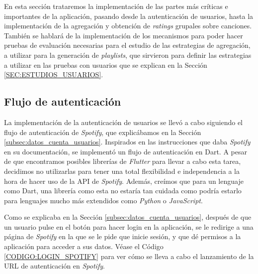 En esta sección trataremos la implementación de las partes más críticas e importantes de la aplicación, pasando desde la 
autenticación de usuarios, hasta la implementación de la agregación y obtención de \textit{ratings} grupales sobre canciones. 
También se hablará de la implementación de los mecanismos para poder hacer pruebas de evaluación necesarias para el estudio de las estrategias de agregación,
 a utilizar para la generación de \textit{playlists}, que sirvieron para definir las estrategias a utilizar en las pruebas con usuarios
 que se explican en la Sección \ref{SEC:ESTUDIOS_USUARIOS}.


\subsection{Flujo de autenticación\label{SEC:FLUJO_AUTENTICACION_IMPLEMENTACION}}

La implementación de la autenticación de usuarios se llevó a cabo siguiendo el flujo de autenticación de \textit{Spotify}, que explicábamos en la Sección 
\ref{subsec:datos_cuenta_usuarios}. Inspirados en las instrucciones que daba \textit{Spotify} en su documentación, se implementó un flujo de autenticación
en Dart. A pesar de que encontramos posibles librerías de \textit{Flutter} para llevar a cabo esta tarea, decidimos no utilizarlas para tener una total flexibilidad
e independencia a la hora de hacer uso de la API de \textit{Spotify}. Además, creímos que para un lenguaje como Dart, una librería como esta no estaría tan cuidada
como podría estarlo para lenguajes mucho más extendidos como \textit{Python} o \textit{JavaScript}. 

Como se explicaba en la Sección \ref{subsec:datos_cuenta_usuarios}, después de que un usuario pulse en el botón para hacer login en la aplicación,
se le redirige a una página de \textit{Spotify} en la que se le pide que inicie sesión, y que dé permisos a la aplicación para acceder a sus datos. Véase el
Código \ref{CODIGO:LOGIN_SPOTIFY} para ver cómo se lleva a cabo el lanzamiento de la URL de autenticación en \textit{Spotify}.




